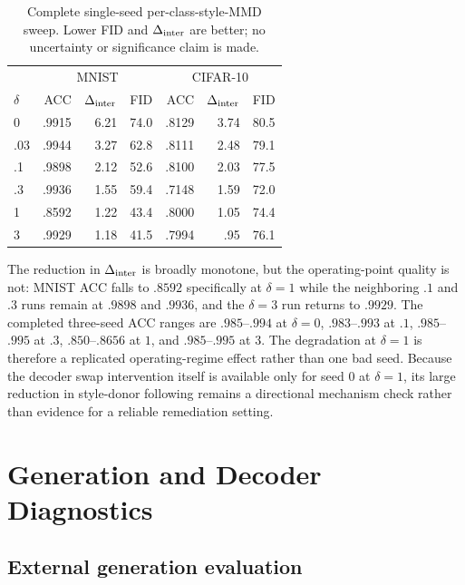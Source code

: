 \begin{table}[ht]
\caption{Complete single-seed per-class-style-MMD sweep.  Lower FID and
$\Delta_{\mathrm{inter}}$ are better; no uncertainty or significance claim is made.}
\label{tab:full-delta-sweep}
\centering
\small
\setlength{\tabcolsep}{4pt}
\begin{tabular}{lrrrrrr}
\toprule
& \multicolumn{3}{c}{MNIST} & \multicolumn{3}{c}{CIFAR-10} \\
$\delta$ & ACC & $\Delta_{\mathrm{inter}}$ & FID & ACC & $\Delta_{\mathrm{inter}}$ & FID \\
\midrule
0    & .9915 & 6.21 & 74.0 & .8129 & 3.74 & 80.5 \\
.03  & .9944 & 3.27 & 62.8 & .8111 & 2.48 & 79.1 \\
.1   & .9898 & 2.12 & 52.6 & .8100 & 2.03 & 77.5 \\
.3   & .9936 & 1.55 & 59.4 & .7148 & 1.59 & 72.0 \\
1    & .8592 & 1.22 & 43.4 & .8000 & 1.05 & 74.4 \\
3    & .9929 & 1.18 & 41.5 & .7994 & .95  & 76.1 \\
\bottomrule
\end{tabular}
\end{table}

The reduction in $\Delta_{\mathrm{inter}}$ is broadly monotone, but the operating-point
quality is not: MNIST ACC falls to $.8592$ specifically at $\delta=1$ while
the neighboring $.1$ and $.3$ runs remain at $.9898$ and $.9936$, and the
$\delta=3$ run returns to $.9929$.  The completed three-seed ACC ranges are
$.985$--$.994$ at $\delta=0$, $.983$--$.993$ at $.1$, $.985$--$.995$ at $.3$,
$.850$--$.8656$ at $1$, and $.985$--$.995$ at $3$.  The degradation at
$\delta=1$ is therefore a replicated operating-regime effect rather than one
bad seed.  Because the decoder swap intervention itself is available only for
seed 0 at $\delta=1$, its large reduction in style-donor following remains a
directional mechanism check rather than evidence for a reliable remediation
setting.

\FloatBarrier

\section{Generation and Decoder Diagnostics}
\label{app:decoder}

\subsection{External generation evaluation}

